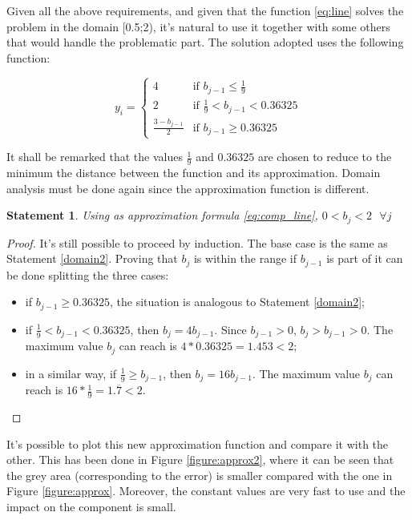 \documentclass[paper=letter, fontsize=12pt]{article}
\newtheorem{theorem}{Statement}
\begin{document}
Given all the above requirements, and given that the function \ref{eq:line} solves the problem in the domain [0.5;2), it's natural to use it together with some others that would handle the problematic part. The solution adopted uses the following function:

\begin{equation}
    \label{eq:comp_line}
    y_i = \begin{cases}
        4 & \mbox{if }b_{j-1} \le \frac{1}{9}\\
        2 & \mbox{if } \frac{1}{9} < b_{j-1} < 0.36325\\
        \frac{3-b_{j-1}}{2} & \mbox{if } b_{j-1} \ge 0.36325
    \end{cases}
\end{equation}

It shall be remarked that the values \(\frac{1}{9}\) and \(0.36325\) are chosen to reduce to the minimum the distance between the function and its approximation. Domain analysis must be done again since the approximation function is different.

\begin{theorem}
    \label{domain3}
    Using as approximation formula \ref{eq:comp_line}, \(0 < b_j < 2\mbox{ } \forall j\)
\end{theorem}

\begin{proof}
    It's still possible to proceed by induction. The base case is the same as Statement \ref{domain2}. Proving that \(b_j\) is within the range if \(b_{j-1}\) is part of it can be done splitting the three cases:
    \begin{itemize}
        \item if \(b_{j-1} \ge 0.36325\), the situation is analogous to Statement \ref{domain2};
        \item if \(\frac{1}{9} < b_{j-1} < 0.36325\), then \(b_j = 4b_{j-1}\). Since \(b_{j-1} > 0\), \(b_j > b_{j-1} > 0\). The maximum value \(b_j\) can reach is \(4 * 0.36325 = 1.453 < 2\);
        \item in a similar way, if \(\frac{1}{9} \ge b_{j-1}\), then \(b_j = 16b_{j-1}\). The maximum value \(b_j\) can reach is \(16 * \frac{1}{9} = 1.\overline{7} < 2\).
    \end{itemize}
\end{proof}

It's possible to plot this new approximation function and compare it with the other. This has been done in Figure \ref{figure:approx2}, where it can be seen that the grey area (corresponding to the error) is smaller compared with the one in Figure \ref{figure:approx}. Moreover, the constant values are very fast to use and the impact on the component is small.
\end{document}
